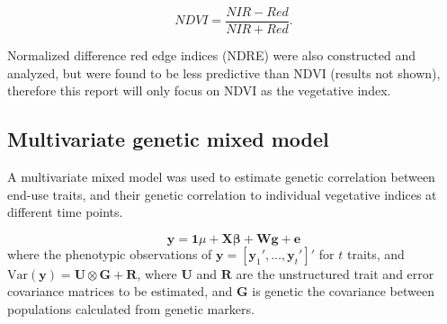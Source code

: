 \documentclass[12pt, letterpaper]{article}
\begin{document}
\begin{equation}
	NDVI = \frac{NIR - Red}{NIR + Red}.
\end{equation}

Normalized difference red edge indices (NDRE) were also constructed and analyzed, but were found to be less predictive than NDVI (results not shown), therefore this report will only focus on NDVI as the vegetative index. 


\subsection{Multivariate genetic mixed model}



A multivariate mixed model was used to estimate genetic correlation between end-use traits, and their genetic correlation to individual vegetative indices at different time points. 

\begin{equation} \label{mt}
	 \mathbf{y} = \mathbf{1} \mu + \mathbf{X} \boldsymbol{\beta} + \mathbf{W}\mathbf{g} + \mathbf{e} 
\end{equation}
where the phenotypic observations of $\mathbf{y} = [\mathbf{y}_1', \ldots, \mathbf{y}_t']'$ for $t$ traits, and $\text{Var}(\mathbf{y}) = \mathbf{U} \otimes \mathbf{G} + \mathbf{R}$, where $\mathbf{U}$ and $\mathbf{R}$ are the unstructured trait and error covariance matrices to be estimated, and $\mathbf{G}$ is genetic the covariance between populations calculated from genetic markers.
 
\end{document}
